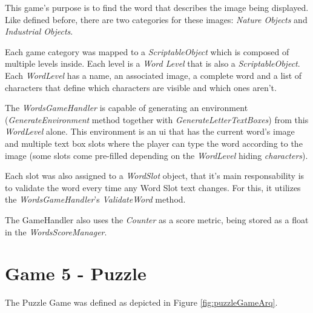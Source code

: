 This game's purpose is to find the word that describes the image being displayed. Like defined before, there are two categories for these images: \textit{Nature Objects} and \textit{Industrial Objects}.

Each game category was mapped to a \textit{ScriptableObject} which is composed of multiple levels inside. Each level is a \textit{Word Level} that is also a \textit{ScriptableObject}. Each \textit{WordLevel} has a name, an associated image, a complete word and a list of characters that define which characters are visible and which ones aren't.

The \textit{WordsGameHandler} is capable of generating an environment (\textit{GenerateEnvironment} method together with \textit{GenerateLetterTextBoxes}) from this \textit{WordLevel} alone. This environment is an \gls{ui} that has the current word's image and multiple text box slots where the player can type the word according to the image (some slots come pre-filled depending on the \textit{WordLevel} hiding \textit{characters}).

Each slot was also assigned to a \textit{WordSlot} object, that it's main responsability is to validate the word every time any Word Slot text changes. For this, it utilizes the \textit{WordsGameHandler}'s \textit{ValidateWord} method.

The GameHandler also uses the \textit{Counter} as a score metric, being stored as a float in the \textit{WordsScoreManager}.

\section{Game 5 - Puzzle}
\label{arqPuzzle}

The Puzzle Game was defined as depicted in Figure \ref{fig:puzzleGameArq}.


